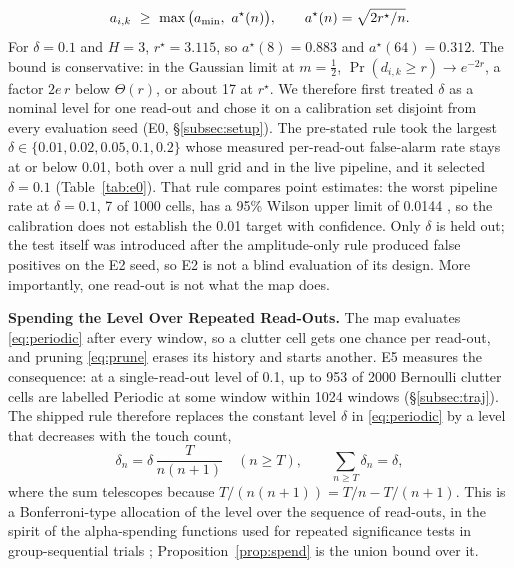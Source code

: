 \begin{equation}\label{eq:astar}
  a_{i,k}\ \ge\ \max\big(a_{\min},\ a^\star(n)\big),\qquad a^\star(n)=\sqrt{2r^\star/n}.
\end{equation}
For $\delta{=}0.1$ and $H{=}3$, $r^\star=3.115$, so $a^\star(8)=0.883$ and $a^\star(64)=0.312$. The bound is conservative: in the Gaussian limit at $m{=}\tfrac12$, $\Pr(d_{i,k}\ge r)\to e^{-2r}$, a factor $2e\,r$ below $\Theta(r)$, or about 17 at $r^\star$. We therefore first treated $\delta$ as a nominal level for one read-out and chose it on a calibration set disjoint from every evaluation seed (E0, \S\ref{subsec:setup}). The pre-stated rule took the largest $\delta\in\{0.01,0.02,0.05,0.1,0.2\}$ whose measured per-read-out false-alarm rate stays at or below 0.01, both over a null grid and in the live pipeline, and it selected $\delta{=}0.1$ (Table~\ref{tab:e0}). That rule compares point estimates: the worst pipeline rate at $\delta{=}0.1$, 7 of 1000 cells, has a 95\% Wilson upper limit of 0.0144 \citep{wilson1927}, so the calibration does not establish the 0.01 target with confidence. Only $\delta$ is held out; the test itself was introduced after the amplitude-only rule produced false positives on the E2 seed, so E2 is not a blind evaluation of its design. More importantly, one read-out is not what the map does.

\noindent\textbf{Spending the Level Over Repeated Read-Outs.} The map evaluates \eqref{eq:periodic} after every window, so a clutter cell gets one chance per read-out, and pruning \eqref{eq:prune} erases its history and starts another. E5 measures the consequence: at a single-read-out level of 0.1, up to 953 of 2000 Bernoulli clutter cells are labelled Periodic at some window within 1024 windows (\S\ref{subsec:traj}). The shipped rule therefore replaces the constant level $\delta$ in \eqref{eq:periodic} by a level that decreases with the touch count,
\begin{equation}\label{eq:spend}
  \delta_n=\delta\,\frac{T}{n(n+1)}\quad(n\ge T),\qquad \sum_{n\ge T}\delta_n=\delta ,
\end{equation}
where the sum telescopes because $T/(n(n{+}1))=T/n-T/(n{+}1)$. This is a Bonferroni-type allocation of the level over the sequence of read-outs, in the spirit of the alpha-spending functions used for repeated significance tests in group-sequential trials \citep{lan1983discrete}; Proposition~\ref{prop:spend} is the union bound over it.

